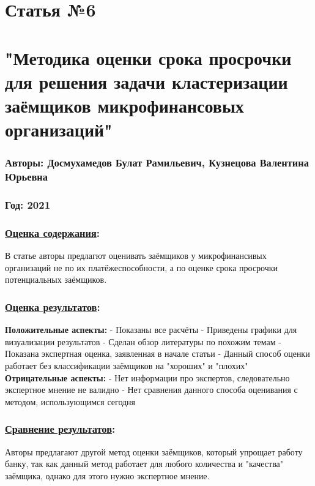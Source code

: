 \documentclass[a4paper,14pt]{article}
\begin{document}
\newpage

\section*{Статья №6}
\section*{"Методика оценки срока просрочки для решения задачи кластеризации заёмщиков микрофинансовых организаций"}
\subsubsection*{Авторы: Досмухамедов Булат Рамильевич, Кузнецова Валентина Юрьевна}
\subsubsection*{Год: 2021}
\subsubsection*{\underline{Оценка содержания}:}
В статье авторы предлагют оценивать заёмщиков у микрофинансивых организаций не по их платёжеспособности, а по оценке срока просрочки потенциальных заёмщиков.
\subsubsection*{\underline{Оценка результатов}:}
\textbf{Положительные аспекты:} \newline
- Показаны все расчёты \newline
- Приведены графики для визуализации результатов\newline
- Сделан обзор литературы по похожим темам\newline
- Показана экспертная оценка, заявленная в начале статьи\newline
- Данный способ оценки работает без классификации заёмщиков на "хороших" и "плохих"
\textbf{Отрицательные аспекты:} \newline
- Нет информации про экспертов, следовательно экспертное мнение не валидно \newline
- Нет сравнения данного способа оценивания с методом, использующимся сегодня \newline
\subsubsection*{\underline{Сравнение результатов}:}
Авторы предлагают другой метод оценки заёмщиков, который упрощает работу банку, так как данный метод работает для любого количества и "качества" заёмщика, однако для этого нужно экспертное мнение.
\end{document}
